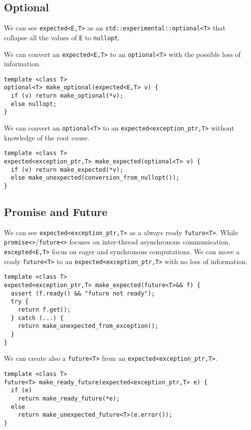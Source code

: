 \documentclass[a4paper,10pt]{article}
\newcommand{\cpp}[1]{\lstinline{#1}}
\begin{document}
\subsection{Optional}

We can see \cpp{expected<E,T>} as an \cpp{std::experimental::optional<T>} that collapse all the values of \cpp{E} to \cpp{nullopt}. 

We can convert an \cpp{expected<E,T>} to an \cpp{optional<T>} with the possible loss of information.

\begin{lstlisting}
template <class T>
optional<T> make_optional(expected<E,T> v) {
  if (v) return make_optional(*v);
  else nullopt;
}
\end{lstlisting}

We can convert an \cpp{optional<T>} to an \cpp{expected<exception_ptr,T>} without knowledge of the root cause.

\begin{lstlisting}
template <class T>
expected<exception_ptr,T> make_expected(optional<T> v) {
  if (v) return make_expected(*v);
  else make_unexpected(conversion_from_nullopt());
}
\end{lstlisting}

\subsection{Promise and Future}

We can see \cpp{expected<exception_ptr,T>} as a always ready \cpp{future<T>}.
While \cpp{promise<>}/\cpp{future<>} focuses on inter-thread asynchronous communication, \cpp{excepted<E,T>} focus on eager and synchronous computations.
We can move a ready \cpp{future<T>} to an \cpp{expected<exception_ptr,T>} with no loss of information. 

\begin{lstlisting}
template <class T>
expected<exception_ptr,T> make_expected(future<T>&& f) {
  assert (f.ready() && "future not ready");
  try {
    return f.get();
  } catch (...) {
    return make_unexpected_from_exception();
  }
}
\end{lstlisting}

We can create also a \cpp{future<T>} from an \cpp{expected<exception_ptr,T>}.

\begin{lstlisting}
template <class T>
future<T> make_ready_future(expected<exception_ptr,T> e) {
  if (e) 
    return make_ready_future(*e);
  else 
    return make_unexpected_future<T>(e.error()); 
}
\end{lstlisting}
\end{document}
